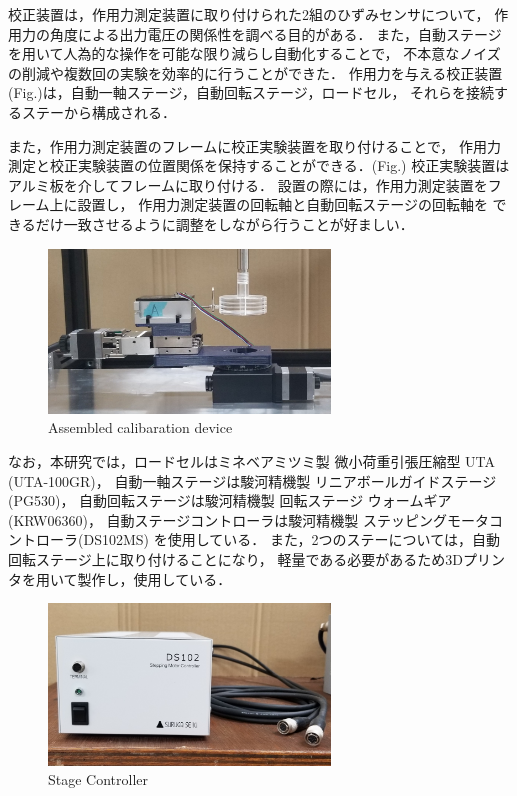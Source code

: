 \newpage

校正装置は，作用力測定装置に取り付けられた2組のひずみセンサについて，
作用力の角度による出力電圧の関係性を調べる目的がある．
また，自動ステージを用いて人為的な操作を可能な限り減らし自動化することで，
不本意なノイズの削減や複数回の実験を効率的に行うことができた．
作用力を与える校正装置(Fig.)は，自動一軸ステージ，自動回転ステージ，ロードセル，
それらを接続するステーから構成される．

また，作用力測定装置のフレームに校正実験装置を取り付けることで，
作用力測定と校正実験装置の位置関係を保持することができる．(Fig.)
校正実験装置はアルミ板を介してフレームに取り付ける．
設置の際には，作用力測定装置をフレーム上に設置し，
作用力測定装置の回転軸と自動回転ステージの回転軸を
できるだけ一致させるように調整をしながら行うことが好ましい．
\begin{figure}[htbp]
    \footnotesize
    \begin{center}
        \includegraphics[width=75mm]{images/22-3.png}
        \caption{Assembled calibaration device}
    \end{center}
\end{figure}

なお，本研究では，ロードセルはミネベアミツミ製 微小荷重引張圧縮型 UTA (UTA-100GR)，
自動一軸ステージは駿河精機製 リニアボールガイドステージ (PG530)，
自動回転ステージは駿河精機製 回転ステージ ウォームギア (KRW06360)，
自動ステージコントローラは駿河精機製 ステッピングモータコントローラ(DS102MS) を使用している．
また，2つのステーについては，自動回転ステージ上に取り付けることになり，
軽量である必要があるため3Dプリンタを用いて製作し，使用している．

\begin{figure}[htbp]
    \footnotesize
    \begin{center}
        \includegraphics[width=75mm]{images/22-4.png}
        \caption{Stage Controller}
    \end{center}
\end{figure}

